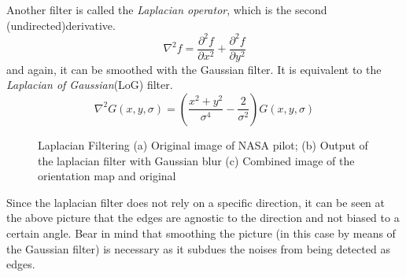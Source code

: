 \documentclass[twoside,a4paper,article]{combine}
\begin{document}
Another filter is called the \emph{Laplacian operator}, which is the second (undirected)derivative.\cite{Szeliski_2022}
\[
    \nabla^2 f = \frac{\partial^2 f}{\partial x^2} + \frac{\partial^2 f}{\partial y^2}
\]
and again, it can be smoothed with the Gaussian filter. It is equivalent to the \emph{Laplacian of Gaussian}(LoG) filter.
\[
    \nabla^2 G (x, y, \sigma) = (\frac{x^2 + y^2}{\sigma^4} - \frac{2}{\sigma^2}) G (x, y, \sigma)
\]
\begin{minipage}{\textwidth}\begin{figure}[H]
    \centering
    \caption{Laplacian Filtering (a) Original image of NASA pilot\cite{NASA_on_The_Commons_1970}; (b) Output of the laplacian filter with Gaussian blur (c) Combined image of the orientation map and original}
    \label{fig:padding_borders}
\end{figure}\end{minipage}

Since the laplacian filter does not rely on a specific direction, it can be seen at the above picture that the edges are agnostic to the direction and not biased to a certain angle. Bear in mind that smoothing the picture (in this case by means of the Gaussian filter)
is necessary as it subdues the noises from being detected as edges.
\end{document}

